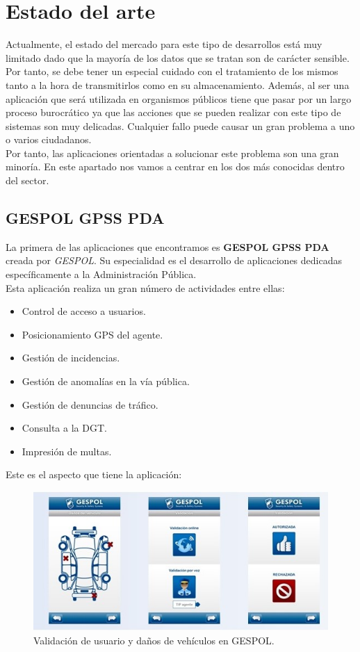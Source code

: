 \chapter{Estado del arte}

Actualmente, el estado del mercado para este tipo de desarrollos está muy limitado dado que 
la mayoría de los datos que se tratan son de carácter sensible. Por tanto, se 
debe tener un especial cuidado con el tratamiento de los mismos tanto a la hora de transmitirlos
como en su almacenamiento. Además, al ser una aplicación que será utilizada en organismos públicos 
tiene que pasar por un largo proceso burocrático ya que las acciones que se pueden realizar con este
tipo de sistemas son muy delicadas. Cualquier fallo puede causar un gran problema a uno o varios ciudadanos.\\

Por tanto, las aplicaciones orientadas a solucionar este problema son una gran minoría. En este apartado nos vamos a centrar en los dos más conocidas dentro del sector.

\section{GESPOL GPSS PDA}
La primera de las aplicaciones que encontramos es \textbf{GESPOL GPSS PDA}\cite{gespol} creada por \textit{GESPOL}. Su especialidad es el desarrollo de 
aplicaciones dedicadas específicamente a la Administración Pública.\\

Esta aplicación realiza un gran número de actividades entre ellas:

\begin{itemize}
	\item Control de acceso a usuarios.
	\item Posicionamiento GPS del agente.
	\item Gestión de incidencias.
	\item Gestión de anomalías en la vía pública.
	\item Gestión de denuncias de tráfico.
	\item Consulta a la DGT.
	\item Impresión de multas.
\end{itemize}

Este es el aspecto que tiene la aplicación: 

\begin{figure}[H]
	\centering
	\includegraphics[scale=0.65]{imagenes/gespol2.jpg}
	\caption{Validación de usuario y daños de vehículos en GESPOL. \label{fig:figura16}}
\end{figure}

